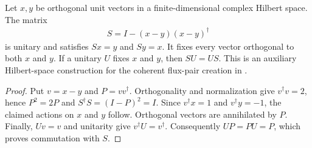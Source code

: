 \begin{lemma}%
    \label{lem:peps_unitary_vector_swap}
    \leanok
    Let $x,y$ be orthogonal unit vectors in a finite-dimensional complex
    Hilbert space. The matrix
    \begin{align}
        S=I-(x-y)(x-y)^\dagger
    \end{align}
    is unitary and satisfies $Sx=y$ and $Sy=x$. It fixes every vector
    orthogonal to both $x$ and $y$. If a unitary $U$ fixes $x$ and $y$, then
    $SU=US$.
    This is an auxiliary Hilbert-space construction for the coherent
    flux-pair creation in \cite[Theorem~6.17]{Schuch2010PEPS}.
\end{lemma}

\begin{proof}\leanok
    Put $v=x-y$ and $P=vv^\dagger$. Orthogonality and normalization give
    $v^\dagger v=2$, hence $P^2=2P$ and $S^\dagger S=(I-P)^2=I$.
    Since $v^\dagger x=1$ and $v^\dagger y=-1$, the claimed actions on
    $x$ and $y$ follow. Orthogonal vectors are annihilated by $P$.
    Finally, $Uv=v$ and unitarity give $v^\dagger U=v^\dagger$.
    Consequently $UP=PU=P$, which proves commutation with $S$.
\end{proof}
